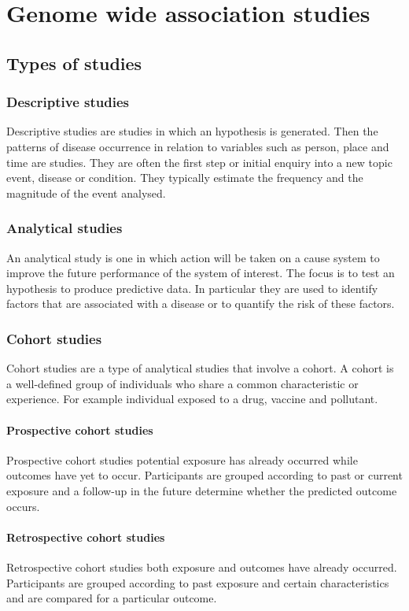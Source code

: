 \chapter{Genome wide association studies}

\section{Types of studies}

	\subsection{Descriptive studies}
	Descriptive studies are studies in which an hypothesis is generated.
	Then the patterns of disease occurrence in relation to variables such as person, place and time are studies.
	They are often the first step or initial enquiry into a new topic event, disease or condition.
	They typically estimate the frequency and the magnitude of the event analysed.

	\subsection{Analytical studies}
	An analytical study is one in which action will be taken on a cause system to improve the future performance of the system of interest.
	The focus is to test an hypothesis to produce predictive data.
	In particular they are used to identify factors that are associated with a disease or to quantify the risk of these factors.

	\subsection{Cohort studies}
	Cohort studies are a type of analytical studies that involve a cohort.
	A cohort is a well-defined group of individuals who share a common characteristic or experience.
	For example individual exposed to a drug, vaccine and pollutant.

		\subsubsection{Prospective cohort studies}
		Prospective cohort studies potential exposure has already occurred while outcomes have yet to occur.
		Participants are grouped according to past or current exposure and a follow-up in the future determine whether the predicted outcome occurs.

		\subsubsection{Retrospective cohort studies}
		Retrospective cohort studies both exposure and outcomes have already occurred.
		Participants are grouped according to past exposure and certain characteristics and are compared for a particular outcome.

